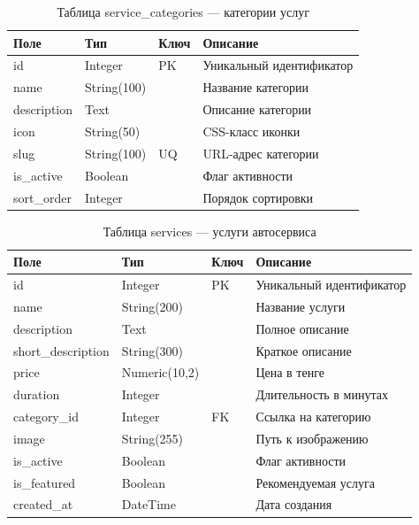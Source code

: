 \documentclass[14pt,a4paper,oneside]{extarticle}
\begin{document}
\begin{table}[H]
\caption{Таблица service\_categories --- категории услуг}\label{tab:categories}
\centering
\begin{tabularx}{\textwidth}{|l|l|l|X|}
\hline
\textbf{Поле} & \textbf{Тип} & \textbf{Ключ} & \textbf{Описание} \\
\hline
id & Integer & PK & Уникальный идентификатор \\
\hline
name & String(100) & & Название категории \\
\hline
description & Text & & Описание категории \\
\hline
icon & String(50) & & CSS-класс иконки \\
\hline
slug & String(100) & UQ & URL-адрес категории \\
\hline
is\_active & Boolean & & Флаг активности \\
\hline
sort\_order & Integer & & Порядок сортировки \\
\hline
\end{tabularx}
\end{table}

\begin{table}[H]
\caption{Таблица services --- услуги автосервиса}\label{tab:services}
\centering
\begin{tabularx}{\textwidth}{|l|l|l|X|}
\hline
\textbf{Поле} & \textbf{Тип} & \textbf{Ключ} & \textbf{Описание} \\
\hline
id & Integer & PK & Уникальный идентификатор \\
\hline
name & String(200) & & Название услуги \\
\hline
description & Text & & Полное описание \\
\hline
short\_description & String(300) & & Краткое описание \\
\hline
price & Numeric(10,2) & & Цена в тенге \\
\hline
duration & Integer & & Длительность в минутах \\
\hline
category\_id & Integer & FK & Ссылка на категорию \\
\hline
image & String(255) & & Путь к изображению \\
\hline
is\_active & Boolean & & Флаг активности \\
\hline
is\_featured & Boolean & & Рекомендуемая услуга \\
\hline
created\_at & DateTime & & Дата создания \\
\hline
\end{tabularx}
\end{table}
\end{document}
